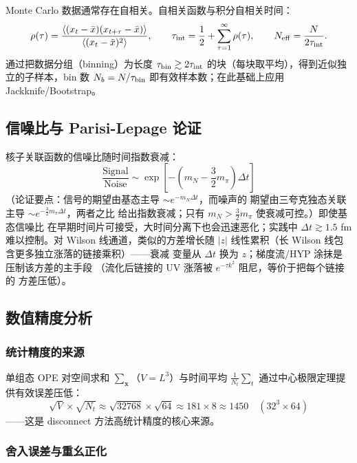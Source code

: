 \documentclass[11pt,a4paper]{ctexart}
\newcommand{\abs}[1]{\lvert #1\rvert}
\begin{document}
Monte Carlo 数据通常存在自相关。自相关函数与积分自相关时间：
\begin{equation}
\rho(\tau) = \frac{\langle (x_t-\bar x)(x_{t+\tau}-\bar x)\rangle}
{\langle (x_t-\bar x)^2\rangle},
\qquad
\tau_{\rm int} = \frac12 + \sum_{\tau=1}^{\infty}\rho(\tau),
\qquad
N_{\rm eff} = \frac{N}{2\tau_{\rm int}}.
\end{equation}
通过把数据分组（binning）为长度 $\tau_{\rm bin}\gtrsim2\tau_{\rm int}$
的块（每块取平均），得到近似独立的子样本，bin 数 $N_b=N/\tau_{\rm bin}$
即有效样本数；在此基础上应用 Jackknife/Bootstrap。

\subsection{信噪比与 Parisi-Lepage 论证}

核子关联函数的信噪比随时间指数衰减：
\begin{equation}
\frac{\text{Signal}}{\text{Noise}} \sim
\exp\!\left[ -\left(m_N - \frac{3}{2}m_\pi\right) \Delta t \right]
\end{equation}
（论证要点：信号的期望由基态主导 $\sim e^{-m_N\Delta t}$，而噪声的
期望由三夸克独态关联主导 $\sim e^{-\frac32m_\pi\Delta t}$，两者之比
给出指数衰减；只有 $m_N>\frac32m_\pi$ 使衰减可控。）即使基态信噪比
在早期时间片可接受，大时间分离下也会迅速恶化；实践中
$\Delta t\gtrsim1.5$ fm 难以控制。对 Wilson 线通道，类似的方差增长随
$\abs{z}$ 线性累积（长 Wilson 线包含更多独立涨落的链接乘积）——衰减
变量从 $\Delta t$ 换为 $z$；梯度流/HYP 涂抹是压制该方差的主手段
（流化后链接的 UV 涨落被 $e^{-\tau k^2}$ 阻尼，等价于把每个链接的
方差压低）。

\subsection{数值精度分析}

\subsubsection{统计精度的来源}

单组态 OPE 对空间求和 $\sum_{\mathbf x}$（$V=L^3$）与时间平均
$\frac1{N_t}\sum_t$ 通过中心极限定理提供有效误差压低：
\begin{equation}
\sqrt{V}\times\sqrt{N_t} \approx \sqrt{32768}\times\sqrt{64}
\approx 181\times8 \approx 1450 \quad(32^3\times64)
\end{equation}
——这是 disconnect 方法高统计精度的核心来源。

\subsubsection{舍入误差与重幺正化}
\end{document}
